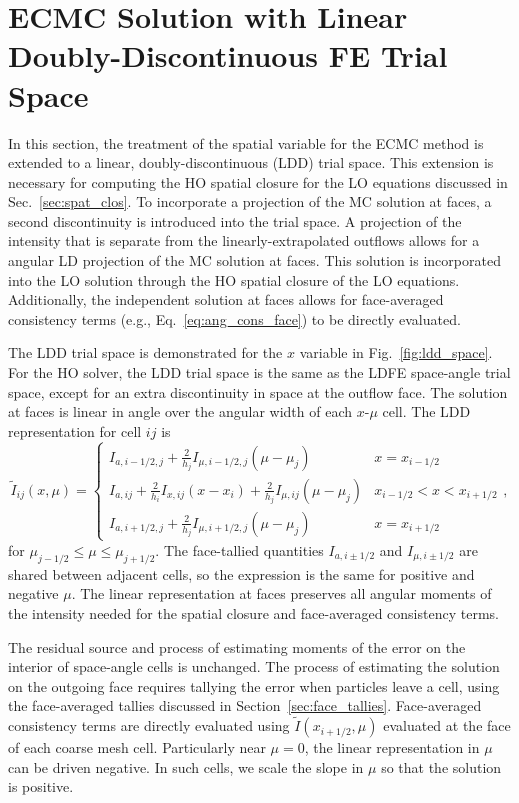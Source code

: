 \section{ECMC Solution with Linear Doubly-Discontinuous FE Trial Space}
\label{sec:ldd_mc}

In this section, the treatment of the spatial variable for the ECMC method is extended to
a linear, doubly-discontinuous
(LDD) trial space.   
This extension is necessary for computing the HO spatial closure for
the LO equations discussed in Sec.~\ref{sec:spat_clos}.  To incorporate a projection of
the MC solution at faces, a second discontinuity is
introduced into the trial space. 
A projection of the intensity
that is separate from the linearly-extrapolated outflows allows for a angular LD
projection of the MC solution at faces.  This solution is incorporated into the LO
solution through the HO spatial closure of 
the LO equations.  Additionally, the independent solution at faces allows for face-averaged
consistency terms (e.g., Eq.~\eqref{eq:ang_cons_face}) to be directly evaluated. 

 The LDD trial space is demonstrated for the $x$ variable in
Fig.~\ref{fig:ldd_space}.   For the HO solver, the LDD trial space is the same as the LDFE
space-angle trial space, except for an extra discontinuity in space at the outflow face.
The solution at faces is linear in angle over the angular width of each $x$-$\mu$ cell.
The LDD representation for cell $ij$ is
\begin{equation}\label{eq:ldd_I}
    \tilde{I}_{ij}(x,\mu) = \left \{ \begin{array}{cl}
        I_{a,i-1/2,j}+\frac{2}{h_j}I_{\mu,i-1/2,j}\left(\mu-\mu_j\right) &
        x=x_{i-1/2} \\
I_{a,ij} + \frac{2}{h_i}I_{x,ij}\left(x-x_i\right) +
\frac{2}{h_j}I_{\mu,ij}\left(\mu-\mu_j\right) & x_{i-1/2} < x < x_{i+1/2}  \\
    I_{a,i+1/2,j}+\frac{2}{h_j}I_{\mu,i+1/2,j}\left(\mu-\mu_j\right) &   x=x_{i+1/2}  
\end{array} \right.,
\end{equation}
for $\mu_{j-1/2} \leq \mu \leq \mu_{j+1/2}$.  The face-tallied quantities $I_{a,i\pm1/2}$ and $I_{\mu,i\pm1/2}$ are shared
between adjacent cells, so the expression is the same for positive and negative $\mu$.
The linear representation at faces preserves all angular moments of the intensity needed for the spatial closure and
face-averaged consistency terms.  

The residual source and process of estimating moments of
the error on the interior of space-angle cells is unchanged.  The process of estimating
the solution on the outgoing face requires tallying the error when particles leave a
cell, using the face-averaged tallies discussed in Section~\ref{sec:face_tallies}.  
Face-averaged consistency terms are directly evaluated using $\tilde
I(x_{i+1/2},\mu)$ evaluated at the face of each coarse mesh cell.   Particularly near
$\mu=0$, the linear representation in $\mu$ can be driven negative.  In such cells, we
scale the slope in $\mu$ so that the solution is positive.

